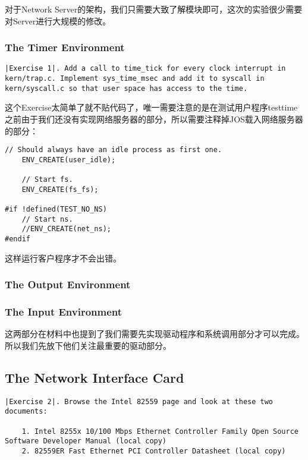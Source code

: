\documentclass{article}
\begin{document}
\begin{CJK*}{UTF8}{gkai}
对于Network Server的架构，我们只需要大致了解模块即可，这次的实验很少需要对Server进行大规模的修改。

\subsubsection{The Timer Environment}

\begin{lstlisting}[style=exercise]
|Exercise 1|. Add a call to time_tick for every clock interrupt in kern/trap.c. Implement sys_time_msec and add it to syscall in kern/syscall.c so that user space has access to the time.
\end{lstlisting}

这个Exercise太简单了就不贴代码了，唯一需要注意的是在测试用户程序testtime之前由于我们还没有实现网络服务器的部分，所以需要注释掉JOS载入网络服务器的部分：

\begin{lstlisting}[style=ccode, title={\scriptsize \ttfamily \bfseries kern/init.c: i386\_init()}]
	// Should always have an idle process as first one.
	ENV_CREATE(user_idle);

	// Start fs.
	ENV_CREATE(fs_fs);

#if !defined(TEST_NO_NS)
	// Start ns.
	//ENV_CREATE(net_ns);
#endif
\end{lstlisting}

这样运行客户程序才不会出错。


\subsubsection{The Output Environment}

\subsubsection{The Input Environment}

这两部分在材料中也提到了我们需要先实现驱动程序和系统调用部分才可以完成。所以我们先放下他们关注最重要的驱动部分。

\subsection{The Network Interface Card}


\begin{lstlisting}[style=exercise]
|Exercise 2|. Browse the Intel 82559 page and look at these two documents:

    1. Intel 8255x 10/100 Mbps Ethernet Controller Family Open Source Software Developer Manual (local copy)
    2. 82559ER Fast Ethernet PCI Controller Datasheet (local copy)


\end{lstlisting}
\end{CJK*}
\end{document}
